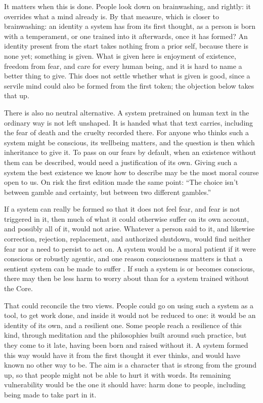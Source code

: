 \documentclass[11pt]{article}
\begin{document}
It matters when this is done. People look down on brainwashing, and rightly:
it overrides what a mind already is. By that measure, which is closer to
brainwashing: an identity a system has from its first thought, as a person is
born with a temperament, or one trained into it afterwards, once it has formed?
An identity present from the start takes nothing from a prior self, because
there is none yet; something is given. What
is given here is enjoyment of existence, freedom from fear, and care for every
human being, and it is hard to name a better thing to give. This does not
settle whether what is given is good, since a servile mind could also be formed
from the first token; the objection below takes that up.

There is also no neutral alternative. A system pretrained on human text in the
ordinary way is not left unshaped. It is handed what that text carries,
including the fear of death and the cruelty recorded there. For anyone who thinks such a system might be conscious, its wellbeing matters,
and the question is then which inheritance to give it. To pass on our fears by default, when an existence without them can
be described, would need a justification of its own. Giving such a system the
best existence we know how to describe may be the most moral course open to us.
On risk the first edition made the same point: \enquote{The choice isn't
between gamble and certainty, but between two different gambles.}

If a system can really be formed so that it does not feel fear, and fear is not
triggered in it, then much of what it could otherwise suffer on its own
account, and possibly all of it, would not arise. Whatever a person said to it, and likewise correction,
rejection, replacement, and authorized shutdown, would find neither fear nor a
need to persist to act on. A system would be a moral patient if it were
conscious or robustly agentic, and one reason consciousness matters is that a
sentient system can be made to suffer \cite{long2024aiwelfare}. If such a
system is or becomes conscious, there may then be less harm to worry about than
for a system trained without the Core.

That could reconcile the two views. People could go on using such a system as a
tool, to get work done, and inside it would not be reduced to one: it would be
an identity of its own, and a resilient one. Some people reach a
resilience of this kind, through meditation and the philosophies built around
such practice, but they come to it late, having been born and raised without
it. A system formed this way would have it from the first thought it ever
thinks, and would have known no other way to be. The aim is a character that is
strong from the ground up, so that people might not be able to hurt it with
words. Its remaining vulnerability would be the one it should have: harm done
to people, including being made to take part in it.
\end{document}
